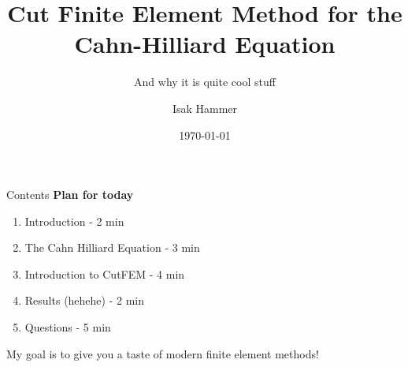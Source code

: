 \documentclass[aspectratio=169]{beamer}
\title[Your Short Title]{ Cut Finite Element Method for the Cahn-Hilliard Equation}
\subtitle{And why it is quite cool stuff}
\author{Isak Hammer}
\date{\today}
\begin{document}
	\maketitle

	

	\begin{frame}{Contents}
        \textbf{Plan for today}
        \begin{enumerate}
        \item Introduction - 2 min
        \item The Cahn Hilliard Equation - 3 min
        \item Introduction to CutFEM - 4 min
        \item Results (hehehe) - 2 min
        \item Questions - 5 min
        \end{enumerate}

        \begin{block}{My goal is to give you a taste of modern finite element methods!}

    \end{block}

	\end{frame}
	




    
\end{document}
